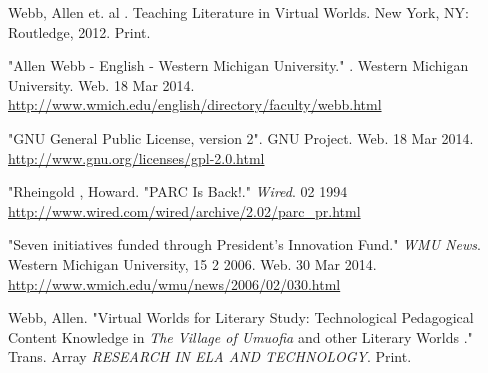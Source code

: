 \documentclass[12pt, letterpaper]{report}
\begin{document}
\printglossary
\begin{thebibliography}{9}

 Webb, Allen et. al . Teaching Literature in Virtual Worlds. New York, NY: Routledge, 2012. Print.

"Allen Webb - English - Western Michigan University." . Western Michigan University. Web. 18 Mar 2014. \\
\url{http://www.wmich.edu/english/directory/faculty/webb.html}

"GNU General Public License, version 2". GNU Project. Web. 18 Mar 2014. \\
\url{http://www.gnu.org/licenses/gpl-2.0.html}


"Rheingold , Howard. "PARC Is Back!." \textit{Wired}. 02 1994 \\
\url{http://www.wired.com/wired/archive/2.02/parc\_pr.html}

"Seven initiatives funded through President's Innovation Fund." \textit{WMU News}. Western Michigan University, 15 2 2006. Web. 30 Mar 2014. \\
\url{http://www.wmich.edu/wmu/news/2006/02/030.html}

Webb, Allen. "Virtual Worlds for Literary Study: Technological Pedagogical Content Knowledge in \textit{The Village of Umuofia} and other Literary Worlds ." Trans. Array \textit{RESEARCH IN ELA AND TECHNOLOGY}. Print.

\end{thebibliography}
	
\end{document}
